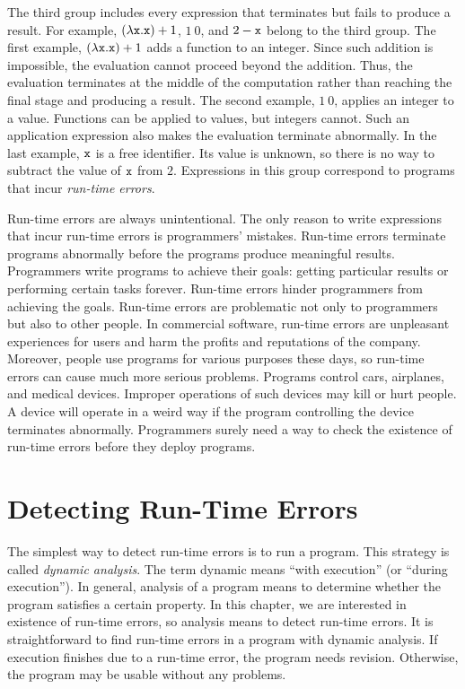 The third group includes every expression that terminates but fails to produce
a result. For example, $(\lambda \texttt{x}.\texttt{x})+1$, $1\ 0$, and $2-\texttt{x}$
belong to the third group. The first example, $(\lambda \texttt{x}.\texttt{x})+1$
adds a function to an integer. Since such addition is impossible, the evaluation
cannot proceed beyond the addition. Thus, the evaluation terminates at the
middle of the computation rather than reaching the final stage and producing a
result. The second example, $1\ 0$, applies an integer to a value. Functions can
be applied to values, but integers cannot. Such an application expression also
makes the evaluation terminate abnormally. In the last example, $\texttt{x}$ is a free
identifier. Its value is unknown, so there is no way to subtract the value of
$\texttt{x}$ from $2$. Expressions in this group correspond to programs that incur
\textit{run-time errors}.

Run-time errors are always unintentional. The only reason to write expressions
that incur run-time errors is programmers' mistakes. Run-time errors terminate
programs abnormally before the programs produce meaningful results. Programmers
write programs to achieve their goals: getting particular results or performing
certain tasks forever. Run-time errors hinder programmers from achieving the
goals. Run-time errors are problematic not only to programmers but also to other
people. In commercial software, run-time errors are unpleasant experiences for users
and harm the profits and reputations of the company. Moreover,
people use programs for various purposes these days, so run-time errors can
cause much more serious problems. Programs control cars, airplanes, and medical
devices. Improper operations of such devices may kill or hurt people. A device
will operate in a weird way if the program controlling the device terminates abnormally.
Programmers surely need a way to check the existence of run-time errors before
they deploy programs.

\section{Detecting Run-Time Errors}

The simplest way to detect run-time errors is to run a program. This strategy is
called \textit{dynamic analysis}. The term dynamic
means ``with execution'' (or ``during execution''). In general, analysis of a
program means to determine whether the program satisfies a certain property. In
this chapter, we are interested in existence of run-time errors, so analysis
means to detect run-time errors.
It is straightforward to find run-time errors in a
program with dynamic analysis. If execution finishes due to a
run-time error, the program needs revision. Otherwise, the program may
be usable without any problems.

